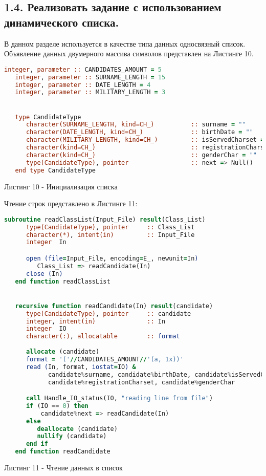 \documentclass[12pt, a4paper]{report}
\begin{document}
\newpage



\begin{center}
\subsection*{1.4. Реализовать задание с использованием динамического списка.}
\end{center}

В данном разделе используется в качестве типа данных односвязный список.
Объявление данных двумерного массива символов представлен на Листинге 10.
\begin{lstlisting}[language=Fortran]
   integer, parameter :: CANDIDATES_AMOUNT = 5
   integer, parameter :: SURNAME_LENGTH = 15
   integer, parameter :: DATE_LENGTH = 4
   integer, parameter :: MILITARY_LENGTH = 3


   type CandidateType
      character(SURNAME_LENGTH, kind=CH_)          :: surname = ""
      character(DATE_LENGTH, kind=CH_)             :: birthDate = ""
      character(MILITARY_LENGTH, kind=CH_)         :: isServedCharset = ""
      character(kind=CH_)                          :: registrationCharset = ""
      character(kind=CH_)                          :: genderChar = ""
      type(CandidateType), pointer                 :: next => Null()
   end type CandidateType
\end{lstlisting}
\begin{center}
Листинг 10 - Инициализация списка
\end{center}


Чтение строк представлено в Листинге 11:
\begin{lstlisting}[language=Fortran]
   subroutine readClassList(Input_File) result(Class_List)
      type(CandidateType), pointer     :: Class_List
      character(*), intent(in)         :: Input_File
      integer  In

      open (file=Input_File, encoding=E_, newunit=In)
         Class_List => readCandidate(In)
      close (In)
   end function readClassList


   recursive function readCandidate(In) result(candidate)
      type(CandidateType), pointer     :: candidate
      integer, intent(in)              :: In
      integer  IO
      character(:), allocatable        :: format
      
      allocate (candidate)
      format = '('//CANDIDATES_AMOUNT//'(a, 1x))'
      read (In, format, iostat=IO) & 
            candidate%surname, candidate%birthDate, candidate%isServedCharset, & 
            candidate%registrationCharset, candidate%genderChar

      call Handle_IO_status(IO, "reading line from file")
      if (IO == 0) then
          candidate%next => readCandidate(In)
      else
         deallocate (candidate)
         nullify (candidate)
      end if
   end function readCandidate
\end{lstlisting}
\begin{center}
Листинг 11 - Чтение данных в список
\end{center}
\end{document}
